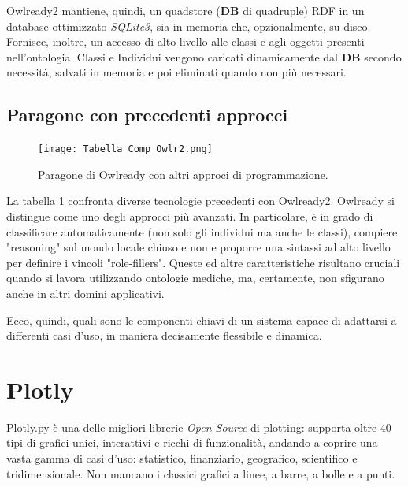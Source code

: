 Owlready2 mantiene, quindi, un quadstore (\textbf{DB} di quadruple) RDF in un database ottimizzato \textit{SQLite3}, sia in memoria che, opzionalmente, su disco.\\
Fornisce, inoltre, un accesso di alto livello alle classi e agli oggetti presenti 
nell'ontologia. Classi e Individui vengono caricati dinamicamente dal \textbf{DB} secondo
necessità, salvati in memoria e poi eliminati quando non più necessari.

\subsection{Paragone con precedenti approcci}

\begin{figure}[h]
	\texttt{[image: Tabella\_Comp\_Owlr2.png]}
	\caption{Paragone di Owlready con altri approci di programmazione.}
	\centering
	\label{fig:tabComparativa}
\end{figure}

La tabella \ref{fig:tabComparativa} confronta diverse tecnologie precedenti con Owlready2.
Owlready si distingue come uno degli approcci più avanzati. In particolare,
è in grado di classificare automaticamente (non solo gli individui ma anche le classi),
compiere "reasoning" sul mondo locale chiuso e non e proporre una sintassi ad alto livello per
definire i vincoli "role-fillers". Queste ed altre caratteristiche risultano cruciali quando
si lavora utilizzando ontologie mediche, ma, certamente, non sfigurano anche in altri domini
applicativi.

Ecco, quindi, quali sono le componenti chiavi di un sistema capace di adattarsi a
differenti casi d’uso, in maniera decisamente flessibile e dinamica.

\clearpage

\section{Plotly} \label{sec: Plotly}
Plotly.py è una delle migliori librerie \textit{Open Source} di plotting: supporta oltre 40 tipi di grafici unici, 
interattivi e ricchi di funzionalità, andando a coprire una vasta gamma di casi d'uso: statistico, finanziario, geografico, 
scientifico e tridimensionale. Non mancano i classici grafici a linee, a barre, a bolle e a punti. \cite{Plotly}

